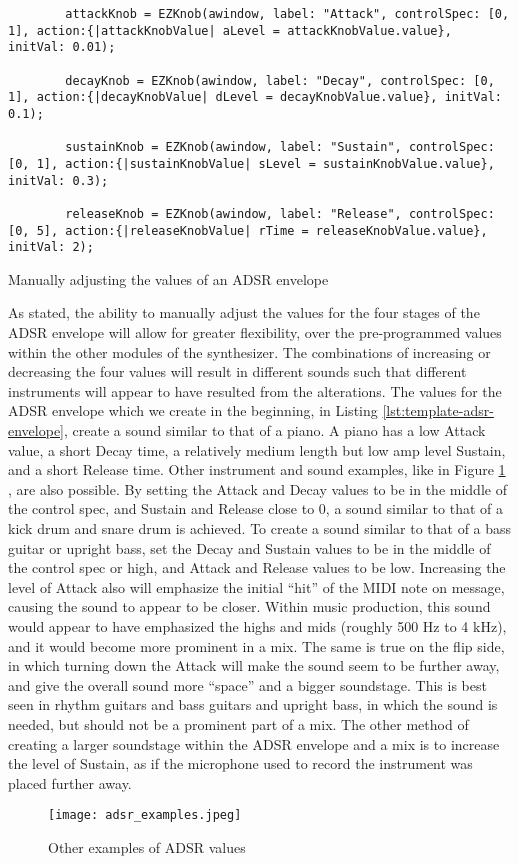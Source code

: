 \begin{listing}
	\begin{lstlisting}
		attackKnob = EZKnob(awindow, label: "Attack", controlSpec: [0, 1], action:{|attackKnobValue| aLevel = attackKnobValue.value}, initVal: 0.01);

		decayKnob = EZKnob(awindow, label: "Decay", controlSpec: [0, 1], action:{|decayKnobValue| dLevel = decayKnobValue.value}, initVal: 0.1);

		sustainKnob = EZKnob(awindow, label: "Sustain", controlSpec: [0, 1], action:{|sustainKnobValue| sLevel = sustainKnobValue.value}, initVal: 0.3);

		releaseKnob = EZKnob(awindow, label: "Release", controlSpec: [0, 5], action:{|releaseKnobValue| rTime = releaseKnobValue.value}, initVal: 2);
	\end{lstlisting}	
	\caption{Manually adjusting the values of an ADSR envelope}
	\label{lst:midi-adsr-manual}
\end{listing}

As stated, the ability to manually adjust the values for the four stages of the ADSR envelope will allow for greater flexibility, over the pre-programmed values within the other modules of the synthesizer. The combinations of increasing or decreasing the four values will result in different sounds such that different instruments will appear to have resulted from the alterations. The values for the ADSR envelope which we create in the beginning, in Listing \ref{lst:template-adsr-envelope}, create a sound similar to that of a piano. A piano has a low Attack value, a short Decay time, a relatively medium length but low amp level Sustain, and a short Release time. Other instrument and sound examples, like in Figure \ref{fig:adsr-examples} \cite{Swisher_2019}, are also possible. By setting the Attack and Decay values to be in the middle of the control spec, and Sustain and Release close to 0, a sound similar to that of a kick drum and snare drum is achieved. To create a sound similar to that of a bass guitar or upright bass, set the Decay and Sustain values to be in the middle of the control spec or high, and Attack and Release values to be low. Increasing the level of Attack also will emphasize the initial ``hit'' of the MIDI note on message, causing the sound to appear to be closer. Within music production, this sound would appear to have emphasized the highs and mids (roughly 500 Hz to 4 kHz), and it would become more prominent in a mix. The same is true on the flip side, in which turning down the Attack will make the sound seem to be further away, and give the overall sound more ``space'' and a bigger soundstage. This is best seen in rhythm guitars and bass guitars and upright bass, in which the sound is needed, but should not be a prominent part of a mix. The other method of creating a larger soundstage within the ADSR envelope and a mix is to increase the level of Sustain, as if the microphone used to record the instrument was placed further away. 

\begin{figure}
  \centering
  \texttt{[image: adsr\_examples.jpeg]}
  \caption{Other examples of ADSR values}
  \label{fig:adsr-examples}
\end{figure}

